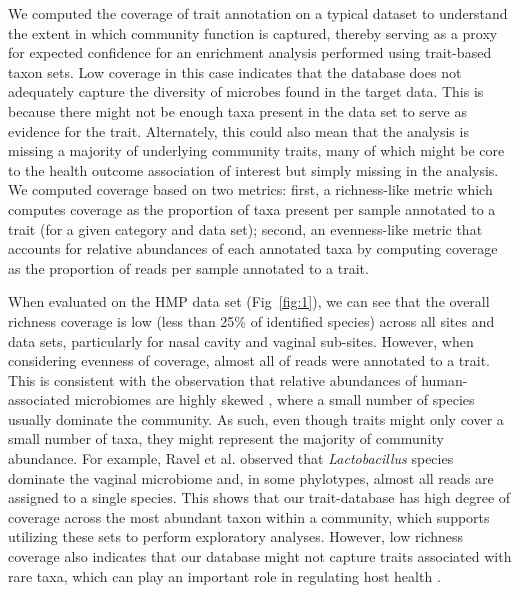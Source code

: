 \documentclass{bmcart}
\begin{document}
We computed the coverage of trait annotation on a typical dataset to understand the extent in which community function is captured, thereby serving as a proxy for expected confidence for an enrichment analysis performed using trait-based taxon sets. Low coverage in this case indicates that the database does not adequately capture the diversity of microbes found in the target data. This is because there might not be enough taxa present in the data set to serve as evidence for the trait. Alternately, this could also mean that the analysis is missing a majority of underlying community traits, many of which might be core to the health outcome association of interest but simply missing in the analysis. We computed coverage based on two metrics: first, a richness-like metric which computes coverage as the proportion of taxa present per sample annotated to a trait (for a given category and data set); second, an evenness-like metric that accounts for relative abundances of each annotated taxa by computing coverage as the proportion of reads per sample annotated to a trait.

When evaluated on the HMP data set (Fig~\ref{fig:1}), we can see that the overall richness coverage is low (less than 25\% of identified species) across all sites and data sets, particularly for nasal cavity and vaginal sub-sites. However, when considering evenness of coverage, almost all of reads were annotated to a trait. This is consistent with the observation that relative abundances of human-associated microbiomes are highly skewed \cite{consortium2012structure}, where a small number of species usually dominate the community. As such, even though traits might only cover a small number of taxa, they might represent the majority of community abundance. For example, Ravel et al. \cite{ravel2011vaginal} observed that \emph{Lactobacillus} species dominate the vaginal microbiome and, in some phylotypes, almost all reads are assigned to a single species. This shows that our trait-database has high degree of coverage across the most abundant taxon within a community, which supports utilizing these sets to perform exploratory analyses. However, low richness coverage also indicates that our database might not capture traits associated with rare taxa, which can play an important role in regulating host health \cite{velazquez2019endogenous}.
\end{document}
